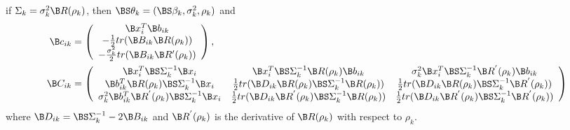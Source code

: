 \begin{theorem}
if $\Sigma_{k}=\sigma_{k}^{2}\B R(\rho_{k})$, then $\BS\theta_{k}=(\BS\beta_{k},\sigma^{2}_{k},\rho_{k})$ and
\begin{align*}
\B c_{ik}&=\left( \begin{array}{c}\B x_{i}^{T}\B b_{ik}\\ -\frac{1}{2}tr( \B B_{ik} \B R(\rho_{k}))\\ -\frac{\sigma^{2}_{k}}{2}tr( \B B_{ik} \B R'(\rho_{k}))\end{array}\right),\\
\B C_{ik}&=\left(\begin{array}{ccc} \B x_{i}^{T}\BS\Sigma_{k}^{-1}\B x_{i}& \B x_{i}^{T}\BS\Sigma_{k}^{-1}\B R(\rho_{k})\B b_{ik}&\sigma^{2}_{k}\B x_{i}^{T} \BS\Sigma^{-1}_{k}\B R^{'}(\rho_{k})\B b_{ik}\\  
\B b^{T}_{ik}\B R(\rho_{k})\BS\Sigma_{k}^{-1}\B x_{i}&\frac{1}{2}tr(\B D_{ik}\B R(\rho_{k})\BS\Sigma_{k}^{-1}\B R(\rho_{k}))&\frac{1}{2}tr(\B D_{ik}\B R(\rho_{k})\BS\Sigma_{k}^{-1}\B R^{'}(\rho_{k}))\\ 
\sigma^{2}_{k}\B b_{ik}^{T}\B R^{'}(\rho_{k}) \BS\Sigma^{-1}_{k}\B x_{i}&\frac{1}{2}tr(\B D_{ik}\B R^{'}(\rho_{k})\BS\Sigma_{k}^{-1}\B R(\rho_{k}))&\frac{1}{2}tr(\B D_{ik}\B R^{'}(\rho_{k})\BS\Sigma_{k}^{-1}\B R^{'}(\rho_{k}))
\end{array} \right)
\end{align*}
where $\B D_{ik} = \BS\Sigma_{k}^{-1}-2\B B_{ik}$ and $\B R^{'}(\rho_{k})$ is the derivative  of $\B R(\rho_{k})$ with respect to $\rho_{k}$. \\


\end{theorem}
